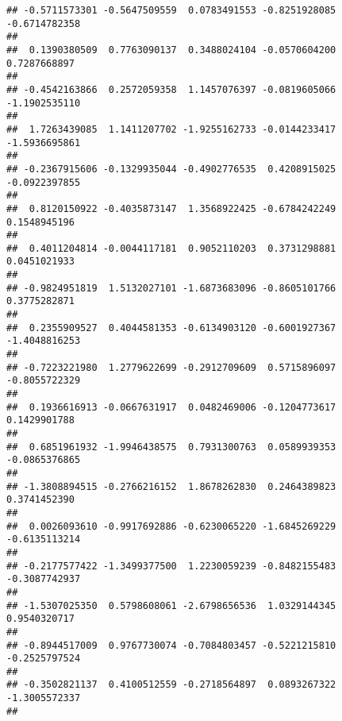 \documentclass[]{article}
\begin{document}
\begin{verbatim}
## -0.5711573301 -0.5647509559  0.0783491553 -0.8251928085 -0.6714782358 
##                                                                       
##  0.1390380509  0.7763090137  0.3488024104 -0.0570604200  0.7287668897 
##                                                                       
## -0.4542163866  0.2572059358  1.1457076397 -0.0819605066 -1.1902535110 
##                                                                       
##  1.7263439085  1.1411207702 -1.9255162733 -0.0144233417 -1.5936695861 
##                                                                       
## -0.2367915606 -0.1329935044 -0.4902776535  0.4208915025 -0.0922397855 
##                                                                       
##  0.8120150922 -0.4035873147  1.3568922425 -0.6784242249  0.1548945196 
##                                                                       
##  0.4011204814 -0.0044117181  0.9052110203  0.3731298881  0.0451021933 
##                                                                       
## -0.9824951819  1.5132027101 -1.6873683096 -0.8605101766  0.3775282871 
##                                                                       
##  0.2355909527  0.4044581353 -0.6134903120 -0.6001927367 -1.4048816253 
##                                                                       
## -0.7223221980  1.2779622699 -0.2912709609  0.5715896097 -0.8055722329 
##                                                                       
##  0.1936616913 -0.0667631917  0.0482469006 -0.1204773617  0.1429901788 
##                                                                       
##  0.6851961932 -1.9946438575  0.7931300763  0.0589939353 -0.0865376865 
##                                                                       
## -1.3808894515 -0.2766216152  1.8678262830  0.2464389823  0.3741452390 
##                                                                       
##  0.0026093610 -0.9917692886 -0.6230065220 -1.6845269229 -0.6135113214 
##                                                                       
## -0.2177577422 -1.3499377500  1.2230059239 -0.8482155483 -0.3087742937 
##                                                                       
## -1.5307025350  0.5798608061 -2.6798656536  1.0329144345  0.9540320717 
##                                                                       
## -0.8944517009  0.9767730074 -0.7084803457 -0.5221215810 -0.2525797524 
##                                                                       
## -0.3502821137  0.4100512559 -0.2718564897  0.0893267322 -1.3005572337 
##                                                                       

\end{verbatim}
\end{document}
